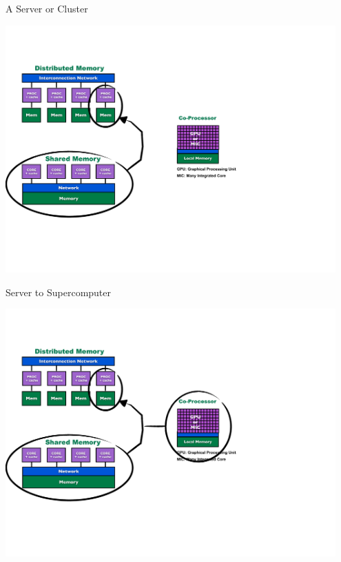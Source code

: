\begin{frame}
\begin{block}{A Server or Cluster}
    
\includegraphics[width=0.95\textwidth]
{../common/pics/hardware/ParallelHardware3.pdf}
\end{block}
\end{frame}

\begin{frame}
\begin{block}{Server to Supercomputer}
    
\includegraphics[width=0.95\textwidth]
{../common/pics/hardware/ParallelHardware4.pdf}
\end{block}
\end{frame}


